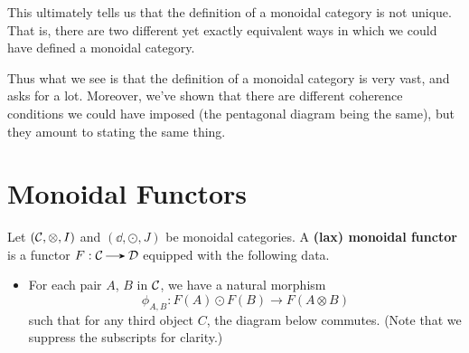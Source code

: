 \textcolor{NavyBlue}{This ultimately tells us that the definition of a monoidal category 
is not unique.} That is, there are two different yet exactly equivalent ways in which 
we could have defined a monoidal category. 

Thus what we see is that the definition of a monoidal category is very vast, 
and asks for a lot. Moreover, we've shown that there are different coherence conditions 
we could have imposed (the pentagonal diagram being the same), 
but they amount to stating the same thing. 

\newpage
\section{Monoidal Functors}
\begin{definition}
    Let $(\mathcal{C}, \otimes, I)$ and $(\dd, \odot, J)$ be monoidal categories. 
    A \textbf{(lax) monoidal functor} is a functor $F: \cc \to \dd$ equipped with
    the following data.
    \begin{itemize}
        \item For each pair $A$, $B$ in $\mathcal{C}$, we have 
        a natural morphism 
        \[
            \phi_{A,B}: F(A)\odot F(B) \to F(A\otimes B)
        \]
        such that for any third object $C$, the diagram below commutes. (Note that 
        we suppress the subscripts for clarity.) 
        \begin{center}
        \end{center}


\end{itemize}
\end{definition}
